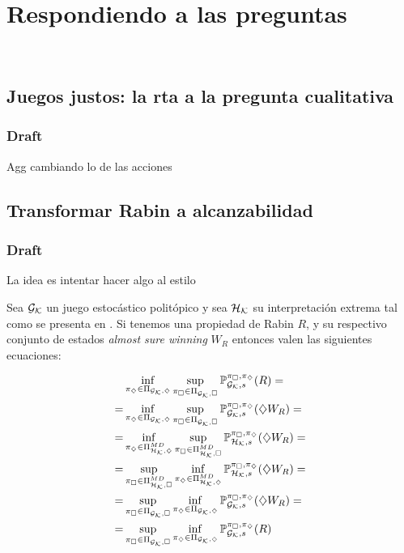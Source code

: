 \chapter{Respondiendo a las preguntas}
~\label{cap:results}

\section{Juegos justos: la rta a la pregunta cualitativa}

\subsection{Draft}

Agg cambiando lo de las acciones

\section{Transformar Rabin a alcanzabilidad}

\subsection{Draft}

La idea es intentar hacer algo al estilo

\begin{theorem}
	Sea $\Gk$ un juego estocástico politópico y sea $\Hk$ su interpretación extrema tal como se presenta en \cite{Polytopal}. Si tenemos una propiedad de Rabin $R$, y su respectivo conjunto de estados \textit{almost sure winning} $W_R$ entonces valen las siguientes ecuaciones:

	\begin{align*}
		&\inf_{\piGdiam} \sup_{\piGcuad} \ProbG(R) = \\
		= &\inf_{\piGdiam} \sup_{\piGcuad} \ProbG(\alc W_R) = \\
		= &\inf_{\piHdiamMD} \sup_{\piHcuadMD} \ProbH(\alc W_R) = \\
		= &\sup_{\piHcuadMD} \inf_{\piHdiamMD} \ProbH(\alc W_R) = \\
		= &\sup_{\piGcuad} \inf_{\piGdiam} \ProbG(\alc W_R) = \\
		= &\sup_{\piGcuad} \inf_{\piGdiam} \ProbG(R)
	\end{align*}

\end{theorem}

